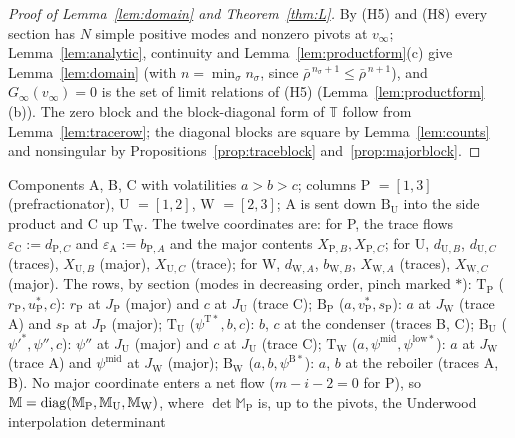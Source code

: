 \documentclass[11pt,a4paper]{report}
\newcommand{\Ts}{\mathrm T}
\newcommand{\Bs}{\mathrm B}
\newcommand{\Mm}{\mathbb M}
\newcommand{\Tm}{\mathbb T}
\begin{document}
\begin{proof}[Proof of Lemma~\ref{lem:domain} and Theorem~\ref{thm:L}]
By (H5) and (H8) every section has \(N\) simple positive modes and nonzero pivots at \(v_\infty\); Lemma~\ref{lem:analytic},
continuity and Lemma~\ref{lem:productform}(c) give Lemma~\ref{lem:domain} (with \(n=\min_\sigma n_\sigma\), since
\(\bar\rho^{\,n_\sigma+1}\le\bar\rho^{\,n+1}\)), and \(G_\infty(v_\infty)=0\) is the set of limit relations of (H5)
(Lemma~\ref{lem:productform}(b)). The zero block and the block-diagonal form of \(\Tm\) follow from Lemma~\ref{lem:tracerow}; the
diagonal blocks are square by Lemma~\ref{lem:counts} and nonsingular by Propositions~\ref{prop:traceblock}
and~\ref{prop:majorblock}.
\end{proof}

\begin{example}[\(N=3\), pattern \((\Bs,\Ts)\)]\label{ex:N3}
Components A, B, C with volatilities \(a>b>c\); columns P \(=[1,3]\) (prefractionator), U \(=[1,2]\), W \(=[2,3]\); A is sent down
\(\Bs_{\mathrm U}\) into the side product and C up \(\Ts_{\mathrm W}\). The twelve coordinates are: for P, the trace flows
\(\varepsilon_{\mathrm C}:=d_{\mathrm P,C}\) and \(\varepsilon_{\mathrm A}:=b_{\mathrm P,A}\) and the major contents \(X_{\mathrm P,B},X_{\mathrm P,C}\); for U,
\(d_{\mathrm U,B}\), \(d_{\mathrm U,C}\) (traces), \(X_{\mathrm U,B}\) (major), \(X_{\mathrm U,C}\) (trace); for W, \(d_{\mathrm W,A}\), \(b_{\mathrm W,B}\),
\(X_{\mathrm W,A}\) (traces), \(X_{\mathrm W,C}\) (major). The rows, by section (modes in decreasing order, pinch marked \(*\)):
\(\Ts_{\mathrm P}\) (\(r_{\mathrm P},u^*_{\mathrm P},c\)): \(r_{\mathrm P}\) at \(J_{\mathrm P}\) (major) and \(c\) at \(J_{\mathrm U}\) (trace C);
\(\Bs_{\mathrm P}\) (\(a,v^*_{\mathrm P},s_{\mathrm P}\)): \(a\) at \(J_{\mathrm W}\) (trace A) and \(s_{\mathrm P}\) at \(J_{\mathrm P}\) (major);
\(\Ts_{\mathrm U}\) (\(\psi^{\Ts*},b,c\)): \(b\), \(c\) at the condenser (traces B, C);
\(\Bs_{\mathrm U}\) (\(\psi'^*,\psi'',c\)): \(\psi''\) at \(J_{\mathrm U}\) (major) and \(c\) at \(J_{\mathrm U}\) (trace C);
\(\Ts_{\mathrm W}\) (\(a,\psi^{\mathrm{mid}},\psi^{\mathrm{low}*}\)): \(a\) at \(J_{\mathrm W}\) (trace A) and \(\psi^{\mathrm{mid}}\) at \(J_{\mathrm W}\) (major);
\(\Bs_{\mathrm W}\) (\(a,b,\psi^{\Bs*}\)): \(a\), \(b\) at the reboiler (traces A, B).
No major coordinate enters a net flow (\(m-i-2=0\) for P), so \(\Mm=\diag(\Mm_{\mathrm P},\Mm_{\mathrm U},\Mm_{\mathrm W})\), where \(\det\Mm_{\mathrm P}\)
is, up to the pivots, the Underwood interpolation determinant

\end{example}
\end{document}
